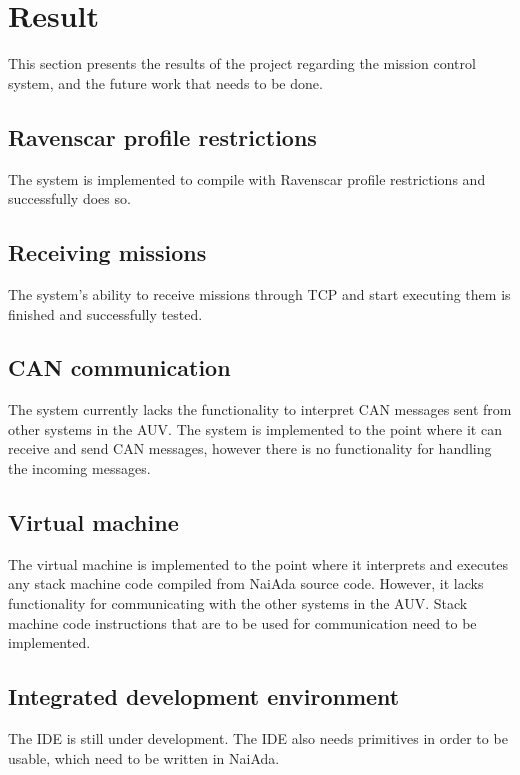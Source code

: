 \section{Result}\label{sec:result}
This section presents the results of the project regarding the mission control system, and the future work that needs to be done. 
\subsection{Ravenscar profile restrictions}
The system is implemented to compile with Ravenscar profile restrictions \cite{article:mcsraven} and successfully does so.

\subsection{Receiving missions}
The system's ability to receive missions through TCP and start executing them is finished and successfully tested.

\subsection{CAN communication}
The system currently lacks the functionality to interpret CAN messages sent from other systems in the AUV. The system is implemented to the point where it can receive and send CAN messages, however there is no functionality for handling the incoming messages.

\subsection{Virtual machine}
The virtual machine is implemented to the point where it interprets and executes any stack machine code compiled from NaiAda source code. However, it lacks functionality for communicating with the other systems in the AUV. Stack machine code instructions that are to be used for communication need to be implemented.

\subsection{Integrated development environment}
The IDE is still under development. The IDE also needs primitives in order to be usable, which need to be written in NaiAda.

